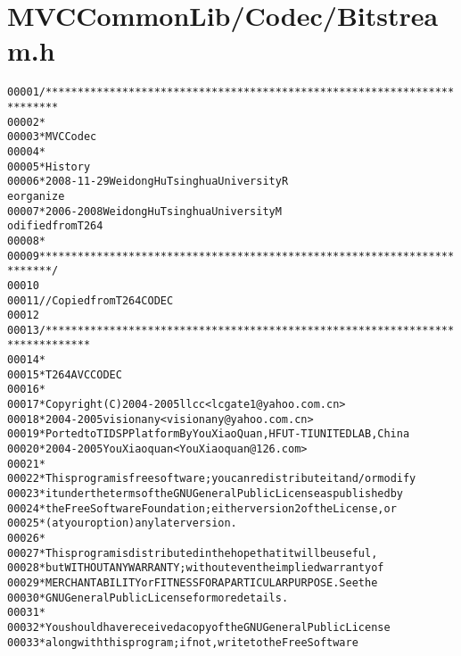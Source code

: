 \hypertarget{_bitstream_8h_source}{
\section{MVCCommonLib/Codec/Bitstream.h}
}


\begin{footnotesize}\begin{alltt}
00001 \textcolor{comment}{/************************************************************************}
00002 \textcolor{comment}{ *}
00003 \textcolor{comment}{ * MVC Codec}
00004 \textcolor{comment}{ * }
00005 \textcolor{comment}{ * History}
00006 \textcolor{comment}{ * 2008-11-29           Weidong Hu              Tsinghua University             R
      eorganize}
00007 \textcolor{comment}{ * 2006-2008            Weidong Hu              Tsinghua University             M
      odified from T264}
00008 \textcolor{comment}{ * }
00009 \textcolor{comment}{ ************************************************************************/}
00010 
00011 \textcolor{comment}{// Copied from T264 CODEC}
00012 
00013 \textcolor{comment}{/*****************************************************************************}
00014 \textcolor{comment}{ *}
00015 \textcolor{comment}{ *  T264 AVC CODEC}
00016 \textcolor{comment}{ *}
00017 \textcolor{comment}{ *  Copyright(C) 2004-2005 llcc <lcgate1@yahoo.com.cn>}
00018 \textcolor{comment}{ *               2004-2005 visionany <visionany@yahoo.com.cn>}
00019 \textcolor{comment}{ *  Ported to TI DSP Platform By YouXiaoQuan, HFUT-TI UNITED LAB,China      }
00020 \textcolor{comment}{ *               2004-2005 You Xiaoquan <YouXiaoquan@126.com>   }
00021 \textcolor{comment}{ *}
00022 \textcolor{comment}{ *  This program is free software ; you can redistribute it and/or modify}
00023 \textcolor{comment}{ *  it under the terms of the GNU General Public License as published by}
00024 \textcolor{comment}{ *  the Free Software Foundation ; either version 2 of the License, or}
00025 \textcolor{comment}{ *  (at your option) any later version.}
00026 \textcolor{comment}{ *}
00027 \textcolor{comment}{ *  This program is distributed in the hope that it will be useful,}
00028 \textcolor{comment}{ *  but WITHOUT ANY WARRANTY ; without even the implied warranty of}
00029 \textcolor{comment}{ *  MERCHANTABILITY or FITNESS FOR A PARTICULAR PURPOSE.  See the}
00030 \textcolor{comment}{ *  GNU General Public License for more details.}
00031 \textcolor{comment}{ *}
00032 \textcolor{comment}{ *  You should have received a copy of the GNU General Public License}
00033 \textcolor{comment}{ *  along with this program ; if not, write to the Free Software}

\end{alltt}
\end{footnotesize}

